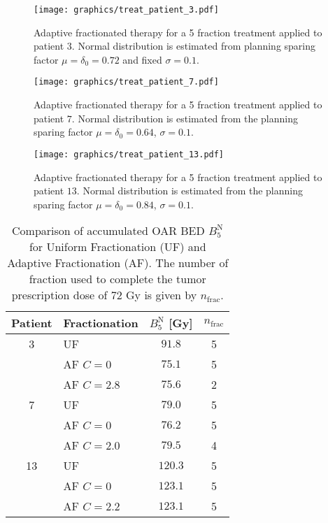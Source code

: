 \documentclass[\relativeRoot/ada.tex]{subfiles}
\begin{document}
\begin{figure}[!htb]
    \centering
    \texttt{[image: graphics/treat\_patient\_3.pdf]}
    \caption{Adaptive fractionated therapy for a 5 fraction treatment applied to patient $3$. Normal distribution is estimated from planning sparing factor $\mu=\delta_0=0.72$ and fixed $\sigma=0.1$.}
    \label{fig:treat_patient_3}
\end{figure}

\begin{figure}[!htb]
    \centering
    \texttt{[image: graphics/treat\_patient\_7.pdf]}
    \caption{Adaptive fractionated therapy for a 5 fraction treatment applied to patient $7$. Normal distribution is estimated from the planning sparing factor $\mu=\delta_0=0.64$, $\sigma=0.1$.}
    \label{fig:treat_patient_7}
\end{figure}

\begin{figure}[!htb]
    \centering
    \texttt{[image: graphics/treat\_patient\_13.pdf]}
    \caption{Adaptive fractionated therapy for a 5 fraction treatment applied to patient $13$. Normal distribution is estimated from the planning sparing factor $\mu=\delta_0=0.84$, $\sigma=0.1$.}
    \label{fig:treat_patient_13}
\end{figure}

\begin{table}[!htb]
    \centering
    \caption{Comparison of accumulated OAR BED $B_5^{\text{N}}$ for Uniform Fractionation (UF) and Adaptive Fractionation (AF). The number of fraction used to complete the tumor prescription dose of $72$ Gy is given by $n_{\text{frac}}$.}
    \begin{tabular}{cl|cc}
    \toprule
        Patient & Fractionation & $B_5^{\text{N}}$ [Gy] & $n_{\text{frac}}$ \\
    \midrule
        3  & UF         & $91.8$ & 5 \\
           & AF $C=0$   & $75.1$ & 5 \\
           & AF $C=2.8$ & $75.6$ & 2 \\
    \midrule
        7  & UF         & $79.0$ & 5 \\
           & AF $C=0$   & $76.2$ & 5 \\
           & AF $C=2.0$ & $79.5$ & 4 \\
    \midrule
        13 & UF        & $120.3$ & 5 \\
          & AF $C=0$   & $123.1$ & 5 \\
          & AF $C=2.2$ & $123.1$ & 5 \\
     
    \bottomrule
    \end{tabular}
    \label{tab:result_treat_patient}
\end{table}
\end{document}
